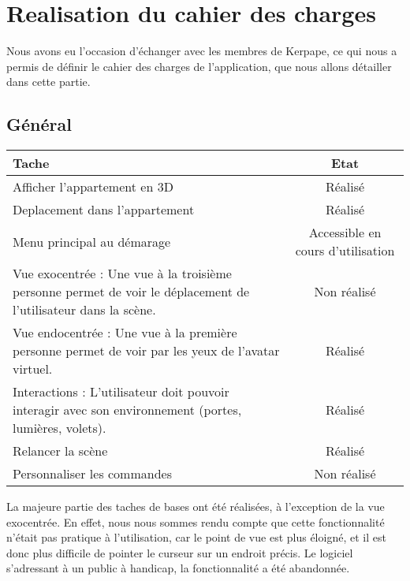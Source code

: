 \section{Realisation du cahier des charges}
Nous avons eu l'occasion d'échanger avec les membres de Kerpape, ce qui nous a permis de définir le cahier des charges de l'application, que nous allons détailler dans cette partie. \\

\subsection{Général}
\begin{tabular}{|p{13cm}|c|}
	\hline
	Tache & Etat \\ \hline
	Afficher l'appartement en 3D & Réalisé \\ \hline
	Deplacement dans l'appartement & Réalisé \\ \hline
	Menu principal au démarage & Accessible en cours d'utilisation \\ \hline
	Vue exocentrée : Une vue à la troisième personne permet de voir le déplacement de l'utilisateur dans la scène. & Non réalisé \\ \hline
	Vue endocentrée : Une vue à la première personne permet de voir par les yeux de l'avatar  virtuel. & Réalisé \\ \hline
	Interactions : L'utilisateur doit pouvoir interagir avec son environnement (portes, lumières, volets). & Réalisé \\ \hline
	Relancer la scène & Réalisé \\ \hline
	Personnaliser les commandes & Non réalisé \\ \hline
\end{tabular}
La majeure partie des taches de bases ont été réalisées, à l'exception de la vue exocentrée. 
En effet, nous nous sommes rendu compte que cette fonctionnalité n'était pas pratique à l'utilisation, car le point de vue est plus éloigné, et il est donc plus difficile de pointer le curseur sur un endroit précis.
Le logiciel s'adressant à un public à handicap, la fonctionnalité a été abandonnée.
	
